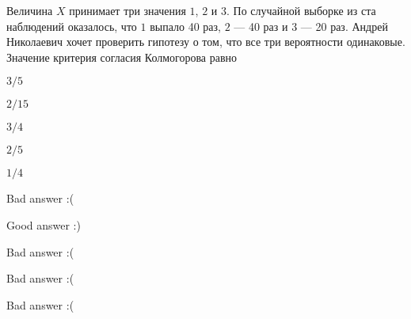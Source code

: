 
\begin{question}
Величина \(X\) принимает три значения \(1\), \(2\) и \(3\). По случайной
выборке из ста наблюдений оказалось, что \(1\) выпало 40 раз, \(2\) ---
40 раз и \(3\) --- 20 раз. Андрей Николаевич хочет проверить гипотезу о
том, что все три вероятности одинаковые. Значение критерия согласия
Колмогорова равно
\begin{answerlist}
  \item \(3/5\)
  \item \(2/15\)
  \item \(3/4\)
  \item \(2/5\)
  \item \(1/4\)
\end{answerlist}
\end{question}

\begin{solution}
\begin{answerlist}
  \item Bad answer :(
  \item Good answer :)
  \item Bad answer :(
  \item Bad answer :(
  \item Bad answer :(
\end{answerlist}
\end{solution}


